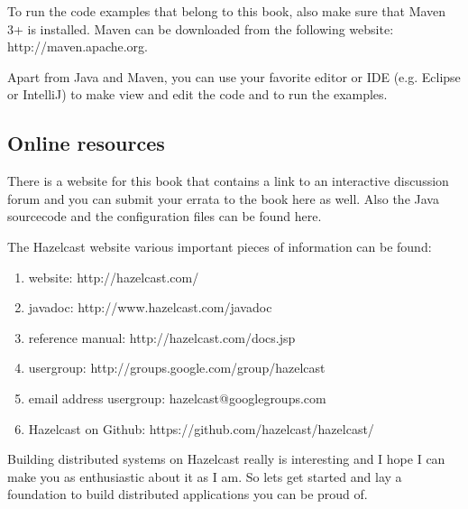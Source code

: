 To run the code examples that belong to this book, also make sure that Maven 3+ is installed. Maven can be downloaded from the
following website: 
http://maven.apache.org.

Apart from Java and Maven, you can use your favorite editor or IDE (e.g. Eclipse or IntelliJ) to make view and edit the code 
and to run the examples. 

\subsection*{Online resources}

There is a website for this book that contains a link to an interactive discussion forum and you can submit your errata to the book 
here as well. Also the Java sourcecode and the configuration files can be found here. 

The Hazelcast website various important pieces of information can be found:
\begin{enumerate}
\item website: http://hazelcast.com/
\item javadoc: http://www.hazelcast.com/javadoc
\item reference manual: http://hazelcast.com/docs.jsp
\item usergroup: http://groups.google.com/group/hazelcast
\item email address usergroup: hazelcast@googlegroups.com
\item Hazelcast on Github: https://github.com/hazelcast/hazelcast/
\end{enumerate}

Building distributed systems on Hazelcast really is interesting and I hope I can make you as enthusiastic about it as I am. 
So lets get started and lay a foundation to build distributed applications you can be proud of.

